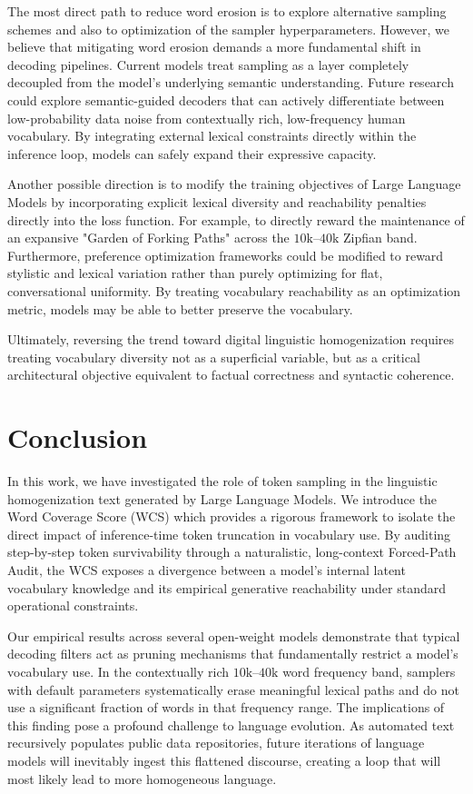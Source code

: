 \documentclass{article}
\begin{document}
The most direct path to reduce word erosion is to explore alternative sampling schemes and also to optimization of the sampler hyperparameters. However, we believe that mitigating word erosion demands a more fundamental shift in decoding pipelines. Current models treat sampling as a layer completely decoupled from the model's underlying semantic understanding. Future research could explore semantic-guided decoders that can actively differentiate between low-probability data noise from contextually rich, low-frequency human vocabulary. By integrating external lexical constraints directly within the inference loop, models can safely expand their expressive capacity.

Another possible direction is to modify the training objectives of Large Language Models by incorporating explicit lexical diversity and reachability penalties directly into the loss function. For example, to directly reward the maintenance of an expansive "Garden of Forking Paths" across the $10\text{k}\text{--}40\text{k}$ Zipfian band. Furthermore, preference optimization frameworks could be modified to reward stylistic and lexical variation rather than purely optimizing for flat, conversational uniformity. By treating vocabulary reachability as an optimization metric, models may be able to better preserve the vocabulary.

Ultimately, reversing the trend toward digital linguistic homogenization requires treating vocabulary diversity not as a superficial variable, but as a critical architectural objective equivalent to factual correctness and syntactic coherence.

\section{Conclusion}
\label{sec::Conclusion}

In this work, we have investigated the role of token sampling in the linguistic homogenization text generated by Large Language Models. We introduce the Word Coverage Score (WCS) which provides a rigorous framework to isolate the direct impact of inference-time token truncation in vocabulary use. By auditing step-by-step token survivability through a naturalistic, long-context Forced-Path Audit, the WCS exposes a divergence between a model's internal latent vocabulary knowledge and its empirical generative reachability under standard operational constraints.

Our empirical results across several open-weight models demonstrate that typical decoding filters act as pruning mechanisms that fundamentally restrict a model's vocabulary use. In the contextually rich $10\text{k}\text{--}40\text{k}$ word frequency band, samplers with default parameters systematically erase meaningful lexical paths and do not use a significant fraction of words in that frequency range. The implications of this finding pose a profound challenge to language evolution. As automated text recursively populates public data repositories, future iterations of language models will inevitably ingest this flattened discourse, creating a loop that will most likely lead to more homogeneous language.
\end{document}
